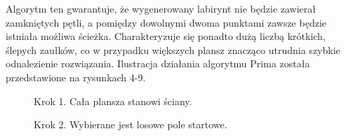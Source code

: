 \documentclass[12pt, a4paper]{article}
\begin{document}
Algorytm ten gwarantuje, że wygenerowany labirynt nie będzie zawierał zamkniętych pętli, a pomiędzy dowolnymi dwoma punktami zawsze będzie istniała możliwa ścieżka. Charakteryzuje się ponadto dużą liczbą krótkich, ślepych zaułków, co w przypadku większych plansz znacząco utrudnia szybkie odnalezienie rozwiązania. Ilustracja działania algorytmu Prima została przedstawione na rysunkach 4-9.

\begin{figure}[ht]
  \centering
  \begin{minipage}{0.45\textwidth}
    \centering
    \caption{\centering Krok 1. Cała plansza stanowi ściany.}
    \label{fig:prim_krok_1}
  \end{minipage}
  \hfill
  \begin{minipage}{0.45\textwidth}
    \centering
    \caption{\centering  Krok 2. Wybierane jest losowe pole startowe.}
    \label{fig:prim_krok_2}
  \end{minipage}
\end{figure}
\end{document}
